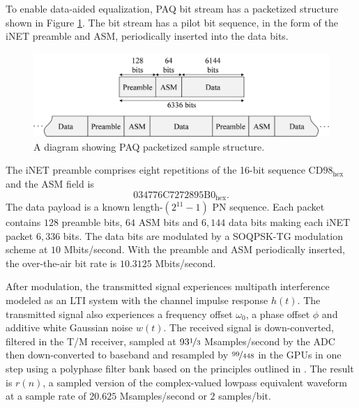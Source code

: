 To enable data-aided equalization, PAQ bit stream has a packetized structure shown in Figure \ref{fig:packetStructure_intro}.
The bit stream has a pilot bit sequence, in the form of the iNET preamble and ASM, periodically inserted into the data bits.
\begin{figure}
	\centering\includegraphics[width=9.47in/100*55]{figures/intro/packetSturcture.pdf}
	\caption{A diagram showing PAQ packetized sample structure.}
	\label{fig:packetStructure_intro}
\end{figure}
The iNET preamble comprises eight repetitions of the 16-bit sequence $\text{CD98}_\text{hex}$ and the ASM field is
\begin{equation}
\text{034776C7272895B0}_\text{hex}.
\end{equation}
The data payload is a known length-$(2^{11} - 1)$ PN sequence.
Each packet contains $128$ preamble bits, $64$ ASM bits and $6{,}144$ data bits making each iNET packet $6{,}336$ bits.
The data bits are modulated by a SOQPSK-TG modulation scheme at $10$ Mbits/second.
With the preamble and ASM periodically inserted, the over-the-air bit rate is $10.3125$ Mbits/second.

After modulation, the transmitted signal experiences multipath interference modeled as an LTI system with the channel impulse response $h(t)$.
The transmitted signal also experiences a frequency offset $\omega_0$, a phase offset $\phi$ and additive white Gaussian noise $w(t)$.
The received signal is down-converted, filtered in the T/M receiver, sampled at $93\nicefrac{1}{3}$ Msamples/second by the ADC then down-converted to baseband and resampled by $\nicefrac{99}{448}$ in the GPUs in one step using a polyphase filter bank based on the principles outlined in \cite[chap. (9)]{rice:2009}.
The result is $r(n)$, a sampled version of the complex-valued lowpass equivalent waveform at a sample rate of $20.625$ Msamples/second or $2$ samples/bit.

